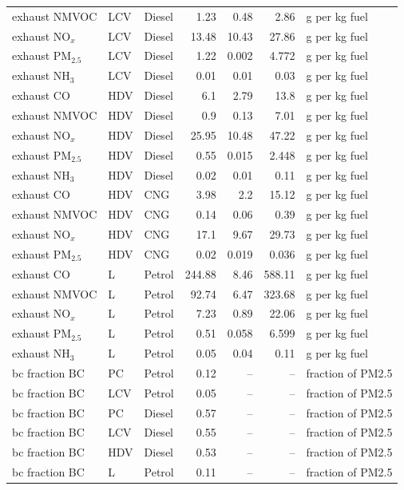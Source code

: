 \begin{table}[!htbp]
\begin{tabular}{@{}lllrrrl@{}}
exhaust NMVOC & LCV & Diesel & 1.23 & 0.48 & 2.86 & g per kg fuel \\
exhaust NO$_x$ & LCV & Diesel & 13.48 & 10.43 & 27.86 & g per kg fuel \\
exhaust PM$_{2.5}$ & LCV & Diesel & 1.22 & 0.002 & 4.772 & g per kg fuel \\
exhaust NH$_3$ & LCV & Diesel & 0.01 & 0.01 & 0.03 & g per kg fuel \\
exhaust CO & HDV & Diesel & 6.1 & 2.79 & 13.8 & g per kg fuel \\
exhaust NMVOC & HDV & Diesel & 0.9 & 0.13 & 7.01 & g per kg fuel \\
exhaust NO$_x$ & HDV & Diesel & 25.95 & 10.48 & 47.22 & g per kg fuel \\
exhaust PM$_{2.5}$ & HDV & Diesel & 0.55 & 0.015 & 2.448 & g per kg fuel \\
exhaust NH$_3$ & HDV & Diesel & 0.02 & 0.01 & 0.11 & g per kg fuel \\
exhaust CO & HDV & CNG & 3.98 & 2.2 & 15.12 & g per kg fuel \\
exhaust NMVOC & HDV & CNG & 0.14 & 0.06 & 0.39 & g per kg fuel \\
exhaust NO$_x$ & HDV & CNG & 17.1 & 9.67 & 29.73 & g per kg fuel \\
exhaust PM$_{2.5}$ & HDV & CNG & 0.02 & 0.019 & 0.036 & g per kg fuel \\
exhaust CO & L & Petrol & 244.88 & 8.46 & 588.11 & g per kg fuel \\
exhaust NMVOC & L & Petrol & 92.74 & 6.47 & 323.68 & g per kg fuel \\
exhaust NO$_x$ & L & Petrol & 7.23 & 0.89 & 22.06 & g per kg fuel \\
exhaust PM$_{2.5}$ & L & Petrol & 0.51 & 0.058 & 6.599 & g per kg fuel \\
exhaust NH$_3$ & L & Petrol & 0.05 & 0.04 & 0.11 & g per kg fuel \\
bc fraction BC & PC & Petrol & 0.12 & -- & -- & fraction of PM2.5 \\
bc fraction BC & LCV & Petrol & 0.05 & -- & -- & fraction of PM2.5 \\
bc fraction BC & PC & Diesel & 0.57 & -- & -- & fraction of PM2.5 \\
bc fraction BC & LCV & Diesel & 0.55 & -- & -- & fraction of PM2.5 \\
bc fraction BC & HDV & Diesel & 0.53 & -- & -- & fraction of PM2.5 \\
bc fraction BC & L & Petrol & 0.11 & -- & -- & fraction of PM2.5 \\

\end{tabular}
\end{table}
